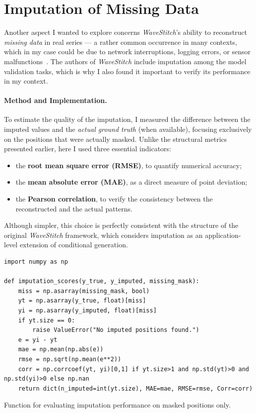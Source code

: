 \section{Imputation of Missing Data}

Another aspect I wanted to explore concerns \emph{WaveStitch}'s ability to reconstruct \emph{missing data} in real series — a rather common occurrence in many contexts, which in my case could be due to network interruptions, logging errors, or sensor malfunctions~\cite{luo2018multivariate}.  
The authors of \emph{WaveStitch} include imputation among the model validation tasks, which is why I also found it important to verify its performance in my context.

\paragraph{Method and Implementation.}
To estimate the quality of the imputation, I measured the difference between the imputed values and the \emph{actual ground truth} (when available), focusing exclusively on the positions that were actually masked.  
Unlike the structural metrics presented earlier, here I used three essential indicators:
\begin{itemize}
  \item the \textbf{root mean square error (RMSE)}, to quantify numerical accuracy;
  \item the \textbf{mean absolute error (MAE)}, as a direct measure of point deviation;
  \item the \textbf{Pearson correlation}, to verify the consistency between the reconstructed and the actual patterns.
\end{itemize}
Although simpler, this choice is perfectly consistent with the structure of the original \emph{WaveStitch} framework, which considers imputation as an application-level extension of conditional generation.

\begin{listing}[H]
\begin{verbatim}
import numpy as np

def imputation_scores(y_true, y_imputed, missing_mask):
    miss = np.asarray(missing_mask, bool)
    yt = np.asarray(y_true, float)[miss]
    yi = np.asarray(y_imputed, float)[miss]
    if yt.size == 0:
        raise ValueError("No imputed positions found.")
    e = yi - yt
    mae = np.mean(np.abs(e))
    rmse = np.sqrt(np.mean(e**2))
    corr = np.corrcoef(yt, yi)[0,1] if yt.size>1 and np.std(yt)>0 and np.std(yi)>0 else np.nan
    return dict(n_imputed=int(yt.size), MAE=mae, RMSE=rmse, Corr=corr)
\end{verbatim}
\caption{Function for evaluating imputation performance on masked positions only.}
\end{listing}

